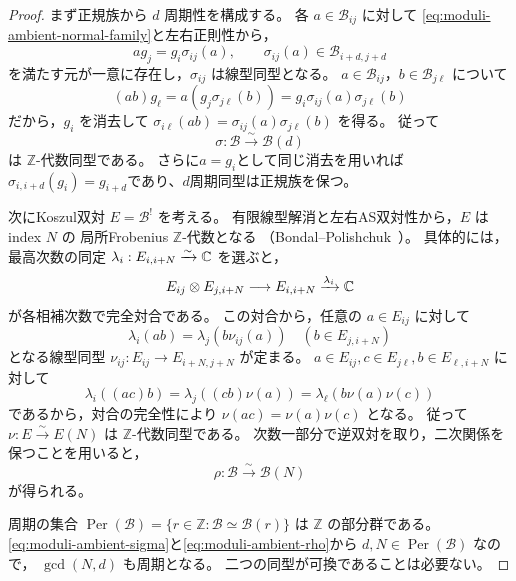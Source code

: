 \begin{proof}
まず正規族から $d$ 周期性を構成する。
各 $a\in\mathcal B_{ij}$ に対して
\eqref{eq:moduli-ambient-normal-family}と左右正則性から，
\begin{equation}
 ag_j=g_i\sigma_{ij}(a),\qquad
 \sigma_{ij}(a)\in\mathcal B_{i+d,j+d}
\end{equation}
を満たす元が一意に存在し，$\sigma_{ij}$ は線型同型となる。
$a\in\mathcal B_{ij}$，$b\in\mathcal B_{j\ell}$ について
\begin{equation}
 (ab)g_\ell
 =a(g_j\sigma_{j\ell}(b))
 =g_i\sigma_{ij}(a)\sigma_{j\ell}(b)
\end{equation}
だから，$g_i$ を消去して
$\sigma_{i\ell}(ab)=\sigma_{ij}(a)\sigma_{j\ell}(b)$ を得る。
従って
\begin{equation}\label{eq:moduli-ambient-sigma}
 \sigma:\mathcal B\xrightarrow{\sim}\mathcal B(d)
\end{equation}
は $\mathbb Z$-代数同型である。
さらに$a=g_i$として同じ消去を用いれば
$\sigma_{i,i+d}(g_i)=g_{i+d}$であり、$d$周期同型は正規族を保つ。

次にKoszul双対 $E=\mathcal B^!$ を考える。
有限線型解消と左右AS双対性から，$E$ はindex $N$ の
局所Frobenius $\mathbb Z$-代数となる
（Bondal--Polishchuk~\cite[Proposition~4.1, \S5]{PBondalPolishchukHelices}）。
具体的には，最高次数の同定
$\lambda_i:E_{i,i+N}\xrightarrow{\sim}\mathbb C$ を選ぶと，
\begin{equation}
 E_{ij}\otimes E_{j,i+N}\longrightarrow E_{i,i+N}
 \xrightarrow{\lambda_i}\mathbb C
\end{equation}
が各相補次数で完全対合である。
この対合から，任意の $a\in E_{ij}$ に対して
\begin{equation}
 \lambda_i(ab)=\lambda_j(b\nu_{ij}(a))
 \quad(b\in E_{j,i+N})
\end{equation}
となる線型同型 $\nu_{ij}:E_{ij}\to E_{i+N,j+N}$ が定まる。
$a\in E_{ij},c\in E_{j\ell},b\in E_{\ell,i+N}$ に対して
\begin{equation}
 \lambda_i((ac)b)
 =\lambda_j((cb)\nu(a))
 =\lambda_\ell(b\nu(a)\nu(c))
\end{equation}
であるから，対合の完全性により
$\nu(ac)=\nu(a)\nu(c)$ となる。
従って $\nu:E\xrightarrow{\sim}E(N)$ は $\mathbb Z$-代数同型である。
次数一部分で逆双対を取り，二次関係を保つことを用いると，
\begin{equation}\label{eq:moduli-ambient-rho}
 \rho:\mathcal B\xrightarrow{\sim}\mathcal B(N)
\end{equation}
が得られる。

周期の集合
$\operatorname{Per}(\mathcal B)=
\{r\in\mathbb Z:\mathcal B\simeq\mathcal B(r)\}$
は $\mathbb Z$ の部分群である。
\eqref{eq:moduli-ambient-sigma}と\eqref{eq:moduli-ambient-rho}から
$d,N\in\operatorname{Per}(\mathcal B)$ なので，
$\gcd(N,d)$ も周期となる。
二つの同型が可換であることは必要ない。
\end{proof}

